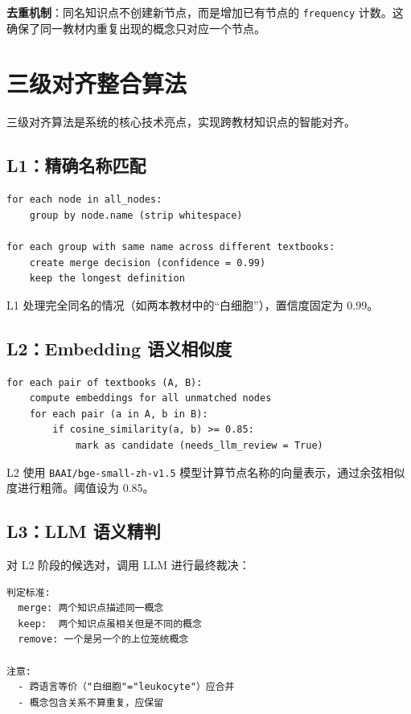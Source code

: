 \documentclass[12pt,a4paper]{article}
\begin{document}
\textbf{去重机制}：同名知识点不创建新节点，而是增加已有节点的 \texttt{frequency} 计数。这确保了同一教材内重复出现的概念只对应一个节点。

\section{三级对齐整合算法}
\label{sec:three-level-alignment}

三级对齐算法是系统的核心技术亮点，实现跨教材知识点的智能对齐。

\subsection{L1：精确名称匹配}

\begin{lstlisting}[title={L1 算法伪代码}]
for each node in all_nodes:
    group by node.name (strip whitespace)

for each group with same name across different textbooks:
    create merge decision (confidence = 0.99)
    keep the longest definition
\end{lstlisting}

L1 处理完全同名的情况（如两本教材中的``白细胞''），置信度固定为 0.99。

\subsection{L2：Embedding 语义相似度}

\begin{lstlisting}[title={L2 算法伪代码}]
for each pair of textbooks (A, B):
    compute embeddings for all unmatched nodes
    for each pair (a in A, b in B):
        if cosine_similarity(a, b) >= 0.85:
            mark as candidate (needs_llm_review = True)
\end{lstlisting}

L2 使用 \texttt{BAAI/bge-small-zh-v1.5} 模型计算节点名称的向量表示，通过余弦相似度进行粗筛。阈值设为 0.85。

\subsection{L3：LLM 语义精判}

对 L2 阶段的候选对，调用 LLM 进行最终裁决：

\begin{lstlisting}[title={L3 LLM Prompt 核心内容}]
判定标准:
  merge: 两个知识点描述同一概念
  keep:  两个知识点虽相关但是不同的概念
  remove: 一个是另一个的上位笼统概念

注意:
  - 跨语言等价（"白细胞"="leukocyte"）应合并
  - 概念包含关系不算重复，应保留
\end{lstlisting}
\end{document}
